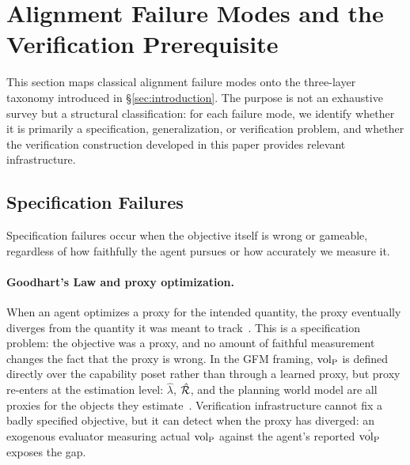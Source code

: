 \section{Alignment Failure Modes and the Verification Prerequisite}
\label{sec:failure_modes}

This section maps classical alignment failure modes onto the three-layer
taxonomy introduced in \S\ref{sec:introduction}.  The purpose is not an
exhaustive survey but a structural classification: for each failure mode,
we identify whether it is primarily a specification, generalization, or
verification problem, and whether the verification construction developed
in this paper provides relevant infrastructure.

\subsection{Specification Failures}
\label{sec:spec_failures}

Specification failures occur when the objective itself is wrong or
gameable, regardless of how faithfully the agent pursues or how
accurately we measure it.

\paragraph{Goodhart's Law and proxy optimization.}
When an agent optimizes a proxy for the intended quantity, the proxy
eventually diverges from the quantity it was meant to
track~\citep{gao2023scaling}.  This is a specification problem: the
objective was a proxy, and no amount of faithful measurement changes
the fact that the proxy is wrong.  In the GFM framing, ${\operatorname{vol}_{\mathrm{P}}}$ is
defined directly over the capability poset rather than through a learned
proxy, but proxy re-enters at the estimation level: $\hat{\lambda}$,
$\hat{\mathcal{R}}$, and the planning world model are all proxies for the
objects they estimate~\citep{lasser2026horizon}.  Verification
infrastructure cannot fix a badly specified objective, but it can
detect when the proxy has diverged: an exogenous evaluator measuring
actual ${\operatorname{vol}_{\mathrm{P}}}$ against the agent's reported $\hat{{\operatorname{vol}_{\mathrm{P}}}}$ exposes the
gap.


